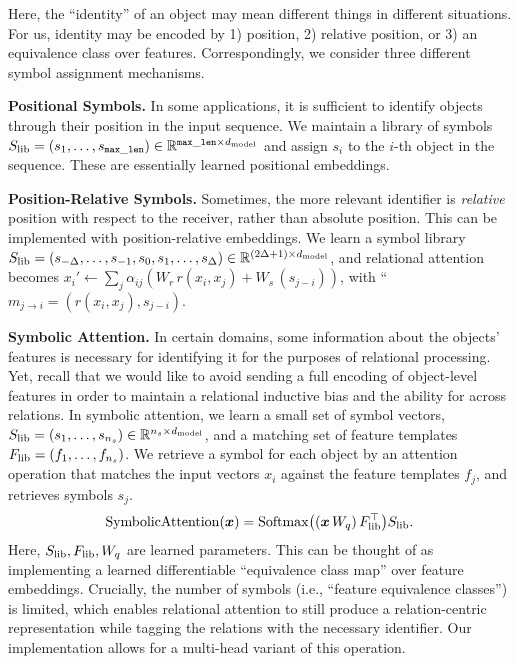 Here, the ``identity'' of an object may mean different things in different situations. For us, identity may be encoded by 1) position, 2) relative position, or 3) an equivalence class over features. 
Correspondingly, we consider three different symbol assignment mechanisms.

\textbf{Positional Symbols.} In some applications, it is sufficient to identify objects through their position in the input sequence. We maintain a library of symbols $S_\mathrm{lib} = (s_1, \ldots, s_{\mathtt{max\_len}}) \in \mathbb{R}^{\mathtt{max\_len} \times d_{\mathrm{model}}}$ and assign $s_i$ to the $i$-th object in the sequence. These are essentially learned positional embeddings.

\textbf{Position-Relative Symbols.} Sometimes, the more relevant identifier is \textit{relative} position with respect to the receiver, rather than absolute position. This can be implemented with position-relative embeddings. We learn a symbol library $S_\mathrm{lib} = (s_{-\Delta}, \ldots, s_{-1}, s_0, s_1, \ldots, s_{\Delta}) \in \mathbb{R}^{(2 \Delta + 1) \times d_{\mathrm{model}}}$, and relational attention becomes $x_i' \gets \sum_{j} \alpha_{ij} (W_r \, r(x_i, x_j) + W_s \, (s_{j-i}))$, with ``$m_{j \to i} = (r(x_i, x_j), s_{j-i})$.

\textbf{Symbolic Attention.} In certain domains, some information about the objects' features is necessary for identifying it for the purposes of relational processing. Yet, recall that we would like to avoid sending a full encoding of object-level features in order to maintain a relational inductive bias and the ability for  across relations. In symbolic attention, we learn a small set of symbol vectors, $S_\mathrm{lib} = (s_1, \ldots, s_{n_s}) \in \mathbb{R}^{n_s \times d_{\mathrm{model}}}$, and a matching set of feature templates $F_\mathrm{lib} = (f_1, \ldots, f_{n_s})$. We retrieve a symbol for each object by an attention operation that matches the input vectors 
$x_i$ against the feature templates $f_j$, and retrieves symbols $s_j$.
\begin{equation}
  \mathrm{SymbolicAttention}(\bm{x}) = \mathrm{Softmax}\big((\bm{x} \, W_q)\, F_\mathrm{lib}^\top\big) S_\mathrm{lib}.
\end{equation}
Here, $S_\mathrm{lib}, F_\mathrm{lib}, W_q$ are learned parameters. This can be thought of as implementing a learned differentiable ``equivalence class map'' over feature embeddings. Crucially, the number of symbols (i.e., ``feature equivalence classes'') is limited, which enables relational attention to still produce a relation-centric representation while tagging the relations with the necessary identifier. Our implementation allows for a multi-head variant of this operation.

